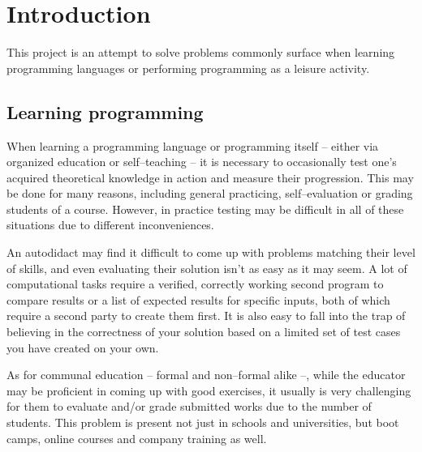 


%

\chapter{Introduction}\label{sect:Intro}

	This project is an attempt to solve problems commonly surface when learning programming languages or performing programming as a leisure activity.

	\section{Learning programming}
	
	When learning a programming language or programming itself -- either via organized education or self--teaching -- it is necessary to occasionally test one's acquired theoretical knowledge in action and measure their progression. This may be done for many reasons, including general practicing, self--evaluation or grading students of a course. However, in practice testing may be difficult in all of these situations due to different inconveniences.
	
	An autodidact may find it difficult to come up with problems matching their level of skills, and even evaluating their solution isn't as easy as it may seem. A lot of computational tasks require a verified, correctly working second program to compare results or a list of expected results for specific inputs, both of which require a second party to create them first. It is also easy to fall into the trap of believing in the correctness of your solution based on a limited set of test cases you have created on your own.
	
	As for communal education -- formal and non--formal alike --, while the educator may be proficient in coming up with good exercises, it usually is very challenging for them to evaluate and/or grade submitted works due to the number of students. This problem is present not just in schools and universities, but boot camps, online courses and company training as well.
	
